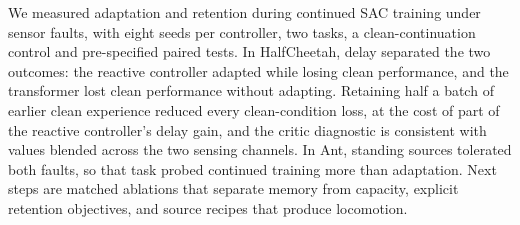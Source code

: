 We measured adaptation and retention during continued SAC training under sensor faults, with eight seeds per controller, two tasks, a clean-continuation control and pre-specified paired tests. In HalfCheetah, delay separated the two outcomes: the reactive controller adapted while losing clean performance, and the transformer lost clean performance without adapting. Retaining half a batch of earlier clean experience reduced every clean-condition loss, at the cost of part of the reactive controller's delay gain, and the critic diagnostic is consistent with values blended across the two sensing channels. In Ant, standing sources tolerated both faults, so that task probed continued training more than adaptation. Next steps are matched ablations that separate memory from capacity, explicit retention objectives, and source recipes that produce locomotion.
